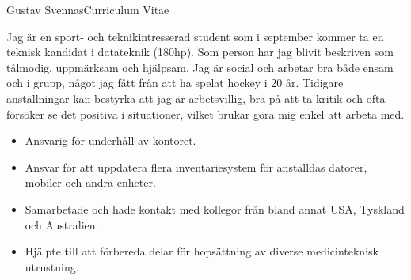 \documentclass{article}
\begin{document}


\begin{cv}{Gustav Svennas}{Curriculum Vitae}


Jag är en sport- och teknikintresserad student som i september kommer ta en teknisk kandidat i datateknik (180hp). Som person har jag blivit beskriven som tålmodig, uppmärksam och hjälpsam. Jag är social och arbetar bra både ensam och i grupp, något jag fått från att ha spelat hockey i 20 år. Tidigare anställningar kan bestyrka att jag är arbetsvillig, bra på att ta kritik och ofta försöker se det positiva i situationer, vilket brukar göra mig enkel att arbeta med.



\begin{cvevent}[2022-07][2022-08]
    \begin{itemize}
        \item Ansvarig för underhåll av kontoret.
    \end{itemize}
\end{cvevent}


\begin{cvevent}[2021-03][2021-10]
    \begin{itemize}
        \item Ansvar för att uppdatera flera inventariesystem för anställdas datorer, mobiler och andra enheter.
        \item Samarbetade och hade kontakt med kollegor från bland annat USA, Tyskland och Australien.
    \end{itemize}
\end{cvevent}


\begin{cvevent}[2015-06][2015-07]
    \begin{itemize}
        \item Hjälpte till att förbereda delar för hopsättning av diverse medicinteknisk utrustning.
    \end{itemize}
\end{cvevent}


\end{cv}
\end{document}
